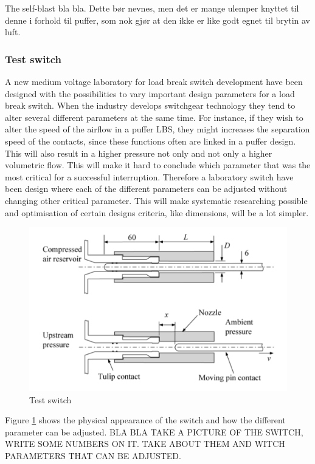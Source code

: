 \documentclass[10pt,a4paper]{article}
\begin{document}
The self-blast bla bla. Dette bør nevnes, men det er mange ulemper knyttet til denne i forhold til puffer, som nok gjør at den ikke er like godt egnet til brytin av luft. 



\subsubsection{Test switch}
A new medium voltage laboratory for load break switch development have been designed with the possibilities to vary important design parameters for a load break switch. When the industry develops switchgear technology they tend to alter several different parameters at the same time. For instance, if they wish to alter the speed of the airflow in a puffer LBS, they might increases the separation speed of the contacts, since these functions often are linked in a puffer design. This will also result in a higher pressure not only and not only a higher volumetric flow. This will make it hard to conclude which parameter that was the most critical for a successful interruption. Therefore a laboratory switch have been design where each of the different parameters can be adjusted without changing other critical parameter. This will make systematic researching possible and optimisation of certain designs criteria, like dimensions, will be a lot simpler.

\begin{figure} [h]
\centering
\includegraphics[scale=0.5]{Bilder/Theory/SchematicTestSwitch.png}
\caption{Test switch} \label{fig:testSwitch}
\end{figure}

Figure \ref{fig:testSwitch} shows the physical appearance of the switch and how the different parameter can be adjusted. BLA BLA TAKE A PICTURE OF THE SWITCH, WRITE SOME NUMBERS ON IT. TAKE ABOUT THEM AND WITCH PARAMETERS THAT CAN BE ADJUSTED.
\end{document}
